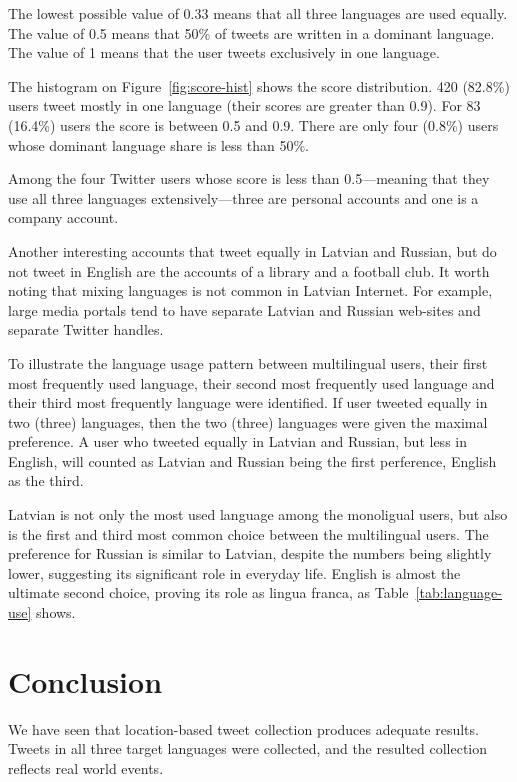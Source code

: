 \documentclass[11pt,a4paper]{article}
\begin{document}
The lowest possible value of 0.33 means that all three languages are used equally. The value of 0.5 means that 50\% of tweets are written in a dominant language. The value of 1 means that the user tweets exclusively in one language.

The histogram on Figure~\ref{fig:score-hist} shows the score distribution. 420 (82.8\%) users tweet mostly in one language (their scores are greater than 0.9). For 83  (16.4\%) users the score is between 0.5 and 0.9. There are only four (0.8\%) users whose dominant language share is less than 50\%.

Among the four Twitter users whose score is less than 0.5---meaning that they use all three languages extensively---three are personal accounts and one is a company account.

Another interesting accounts that tweet equally in Latvian and Russian, but do not tweet in English are the accounts of a library and a football club. It worth noting that mixing languages is not common in Latvian Internet. For example, large media portals tend to have separate Latvian and Russian web-sites and separate Twitter handles.

To illustrate the language usage pattern between multilingual users, their first most frequently used language, their second most frequently used language and their third most frequently language were identified. If user tweeted equally in two (three) languages, then the two (three) languages were given the maximal preference. A user who tweeted equally in Latvian and Russian, but less in English, will counted as Latvian and Russian being the first perference, English as the third.

Latvian is not only the most used language among the monoligual users, but also is the first and third most common choice between the multilingual users. The preference for Russian is similar to Latvian, despite the numbers being slightly lower, suggesting its significant role in everyday life. English is almost the ultimate second choice, proving its role as lingua franca, as Table~\ref{tab:language-use} shows.



\section{Conclusion}

We have seen that location-based tweet collection produces adequate results. Tweets in all three target languages were collected, and the resulted collection reflects real world events.
\end{document}
